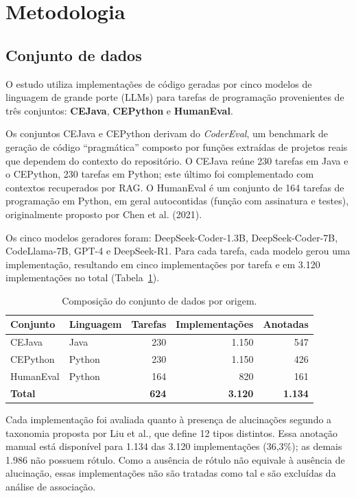 \section{Metodologia}

\subsection{Conjunto de dados}

O estudo utiliza implementações de código geradas por cinco modelos de linguagem de grande porte (LLMs) para tarefas de programação provenientes de três conjuntos: \textbf{CEJava}, \textbf{CEPython} e \textbf{HumanEval}.

Os conjuntos CEJava e CEPython derivam do \textit{CoderEval}, um benchmark de geração de código ``pragmática'' composto por funções extraídas de projetos reais que dependem do contexto do repositório. O CEJava reúne 230 tarefas em Java e o CEPython, 230 tarefas em Python; este último foi complementado com contextos recuperados por RAG. O HumanEval é um conjunto de 164 tarefas de programação em Python, em geral autocontidas (função com assinatura e testes), originalmente proposto por Chen et al. (2021).

Os cinco modelos geradores foram: DeepSeek-Coder-1.3B, DeepSeek-Coder-7B, CodeLlama-7B, GPT-4 e DeepSeek-R1. Para cada tarefa, cada modelo gerou uma implementação, resultando em cinco implementações por tarefa e em 3.120 implementações no total (Tabela~\ref{tab:datasets}).

\begin{table}[ht]
    \centering
    \caption{Composição do conjunto de dados por origem.}
    \label{tab:datasets}
    \begin{tabular}{llrrr}
        \hline
        \textbf{Conjunto} & \textbf{Linguagem} & \textbf{Tarefas} & \textbf{Implementações} & \textbf{Anotadas} \\
        \hline
        CEJava    & Java   & 230 & 1.150 & 547 \\
        CEPython  & Python & 230 & 1.150 & 426 \\
        HumanEval & Python & 164 &   820 & 161 \\
        \hline
        \textbf{Total} & & \textbf{624} & \textbf{3.120} & \textbf{1.134} \\
        \hline
    \end{tabular}
\end{table}

Cada implementação foi avaliada quanto à presença de alucinações segundo a taxonomia proposta por Liu et al., que define 12 tipos distintos. Essa anotação manual está disponível para 1.134 das 3.120 implementações (36,3\%); as demais 1.986 não possuem rótulo. Como a ausência de rótulo não equivale à ausência de alucinação, essas implementações não são tratadas como tal e são excluídas da análise de associação.

